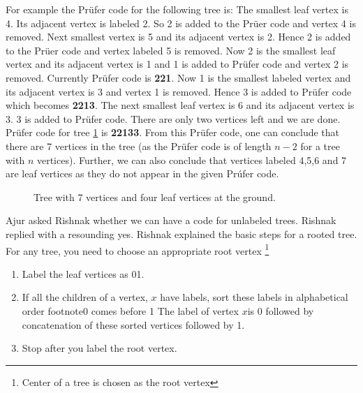 For example the Pr{\"u}fer code for the following tree is: The smallest leaf vertex is 4. Its adjacent vertex is labeled 2. So 2 is added to the Pr{\"u}er code and vertex 4 is removed. Next smallest vertex is 5 and its adjacent vertex is 2. Hence 2 is added to the Pr{\"u}er code and vertex labeled 5 is removed. Now 2 is the smallest leaf vertex and its adjacent vertex is 1 and  1 is added to Pr{\"u}fer code and vertex 2 is removed. Currently Pr{\"u}fer code is \textbf{221}. Now 1 is the smallest labeled vertex and its adjacent vertex is 3 and vertex 1 is removed. Hence 3 is added to Pr{\"u}fer code which becomes \textbf{2213}. The next smallest leaf vertex is 6 and its adjacent vertex is 3. 3 is added to Pr{\"u}fer code. There are only two vertices left and we are done. Pr{\"u}fer code for tree \ref{8g5} is \textbf{22133}. From this Pr{\"u}fer code, one can conclude that there are 7 vertices in the tree (as the Pr{\"u}fer code is of length $n-2$ for a tree with $n$ vertices). Further, we can also conclude that vertices labeled 4,5,6 and 7 are leaf vertices as they do not appear in the given Pr{\'u}fer code. 
\begin{figure}
\begin{center}


\caption{Tree with 7 vertices and four leaf vertices at the ground. }\label{8g5}
\end{center}
\end{figure}

Ajur asked Rishnak whether we can have a code for unlabeled trees. Rishnak replied with a resounding yes. Rishnak explained the basic steps for a rooted tree. For any tree, you need to choose an appropriate root vertex \footnote{Center of a tree is chosen as the root vertex} 
\begin{enumerate}
    \item  Label the leaf vertices as 01.
    \item If all the children of a vertex, $x$ have labels, sort these labels in alphabetical order footnote{0 comes before 1} The label of vertex $x$is 0 followed by concatenation of these sorted vertices followed by 1.
    \item Stop after you label the root vertex.
\end{enumerate}


